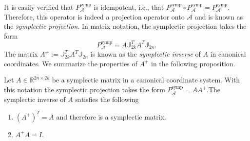 It is easily verified that $P^{\text{symp}}_{\mathcal A}$ is idempotent, i.e., that $P^{\text{symp}}_{\mathcal A}\circ P^{\text{symp}}_{\mathcal A} = P^{\text{symp}}_{\mathcal A}$. Therefore, this operator is indeed a projection operator onto $\mathcal A$ and is known as the \emph{symplectic projection}. In matrix notation, the symplectic projection takes the form
\begin{equation} \label{p1.eq:SyMo:1.5}
	P^{\text{symp}}_{\mathcal A} = A \mathbb J_{2k}^T A^T \mathbb J_{2n}.
\end{equation}
The matrix $A^+ := \mathbb J_{2k}^T A^T \mathbb J_{2n}$ is known as the \emph{symplectic inverse} of $A$ in canonical coordinates. We summarize the properties of $A^+$ in the following proposition.
\begin{proposition} \label{p1.theorem:1}
\cite{doi:10.1137/140978922} Let $A\in \mathbb R^{2n\times 2k}$ be a symplectic matrix in a canonical coordinate system. With this notation the symplectic projection takes the form $P^{\text{symp}}_{\mathcal A} = AA^+$.The symplectic inverse of $A$ satisfies the following
\begin{enumerate} [label=(\alph*)]
\item $(A^+)^T = A$ and therefore is a symplectic matrix.
\item $A^+A = I$.
\end{enumerate}
\end{proposition}

